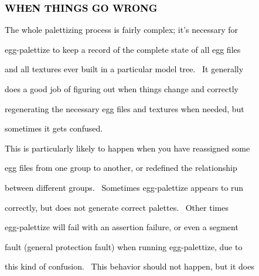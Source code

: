 \documentclass[a4paper]{article}
\newcommand\textstyleOOoComputerKeyWord[1]{\textrm{\textcolor[rgb]{0.0,0.0,0.5019608}{#1}}}
\begin{document}
\bigskip

\subsubsection[WHEN THINGS GO WRONG]{\textstyleOOoComputerKeyWord{\textcolor{black}{WHEN THINGS GO WRONG}}}
\hypertarget{RefHeading7668869075401}{}
\bigskip

{\color{black}
\textstyleOOoComputerKeyWord{\textcolor{black}{The whole palettizing process is fairly complex; it's necessary for}}}

{\color{black}
\textstyleOOoComputerKeyWord{\textcolor{black}{egg-palettize to keep a record of the complete state of all egg files}}}

{\color{black}
\textstyleOOoComputerKeyWord{\textcolor{black}{and all textures ever built in a particular model tree. \ It generally}}}

{\color{black}
\textstyleOOoComputerKeyWord{\textcolor{black}{does a good job of figuring out when things change and correctly}}}

{\color{black}
\textstyleOOoComputerKeyWord{\textcolor{black}{regenerating the necessary egg files and textures when needed, but}}}

{\color{black}
\textstyleOOoComputerKeyWord{\textcolor{black}{sometimes it gets confused.}}}


\bigskip

{\color{black}
\textstyleOOoComputerKeyWord{\textcolor{black}{This is particularly likely to happen when you have reassigned some}}}

{\color{black}
\textstyleOOoComputerKeyWord{\textcolor{black}{egg files from one group to another, or redefined the relationship}}}

{\color{black}
\textstyleOOoComputerKeyWord{\textcolor{black}{between different groups. \ Sometimes egg-palettize appears to run}}}

{\color{black}
\textstyleOOoComputerKeyWord{\textcolor{black}{correctly, but does not generate correct palettes. \ Other times}}}

{\color{black}
\textstyleOOoComputerKeyWord{\textcolor{black}{egg-palettize will fail with an assertion failure, or even a segment}}}

{\color{black}
\textstyleOOoComputerKeyWord{\textcolor{black}{fault (general protection fault) when running egg-palettize, due to}}}

{\color{black}
\textstyleOOoComputerKeyWord{\textcolor{black}{this kind of confusion. \ This behavior should not happen, but it does}}}
\end{document}

